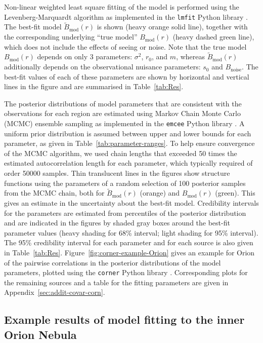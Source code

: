 \documentclass[fleqn,usenatbib, useAMS, a4paper]{mnras}
\newcommand\noise{\ensuremath{_{\text{noise}}}}
\newcommand\model{\ensuremath{_{\mathrm{mod}}}}
\begin{document}
Non-linear weighted least square fitting of the model is performed
using the Levenberg-Marquardt algorithm \citep{More:1978a} as implemented in the
\texttt{lmfit} Python library \citep{newville_matthew_2014_11813}.
The best-fit model \(\tilde{B}\model(r)\) is shown (heavy orange solid line),
together with the corresponding underlying ``true model'' \(B\model(r)\) (heavy dashed green line),
which does not include the effects of seeing or noise.
Note that the true model \(B\model(r)\) depends on only 3 parameters:
\(\sigma^2\), \(r_0\), and \(m\),
whereas \(\tilde{B}\model(r)\) additionally depends on
the observational nuisance parameters: \(s_0\) and \(B\noise\).
The best-fit values of each of these parameters are shown by
horizontal and vertical lines in the figure and are summarised in Table~\ref{tab:Res}.

The posterior distributions of model parameters
that are consistent with the observations for each region are estimated
using Markov Chain Monte Carlo (MCMC) ensemble sampling \citep{2010CAMCS...5...65G}
as implemented in the \texttt{emcee} Python library \citep{2013PASP..125..306F}.
A uniform prior distribution is assumed between upper and lower bounds
for each parameter, as given in Table~\ref{tab:parameter-ranges}.
To help ensure convergence of the MCMC algorithm,
we used chain lengths that exceeded \num{50} times the
estimated autocorrelation length for each parameter,
which typically required of order \num{50000} samples.
Thin translucent lines in the figures show structure functions using the parameters of
a random selection of \num{100} posterior samples from the MCMC chain,
both for \(\tilde{B}\model(r)\) (orange) and \(B\model(r)\) (green).
This gives an estimate in the uncertainty about the best-fit model.
Credibility intervals for the parameters are estimated from percentiles
of the posterior distribution and are indicated in the figures by shaded gray boxes
around the best-fit parameter values
(heavy shading for 68\% interval; light shading for 95\% interval).
The 95\% credibility interval for each parameter and for each source
is also given in Table~\ref{tab:Res}.
Figure~\ref{fig:corner-example-Orion} gives an example for Orion of
the pairwise correlations in the posterior distributions of the model parameters,
plotted using the \texttt{corner} Python library \citep{2017ascl.soft02002F}.
Corresponding plots for the remaining sources and a table for the fitting parameters are given in Appendix~\ref{sec:addit-covar-corn}.


\subsection{Example results of model fitting to the inner Orion Nebula}
\label{sec:example-results-orion}
\end{document}
